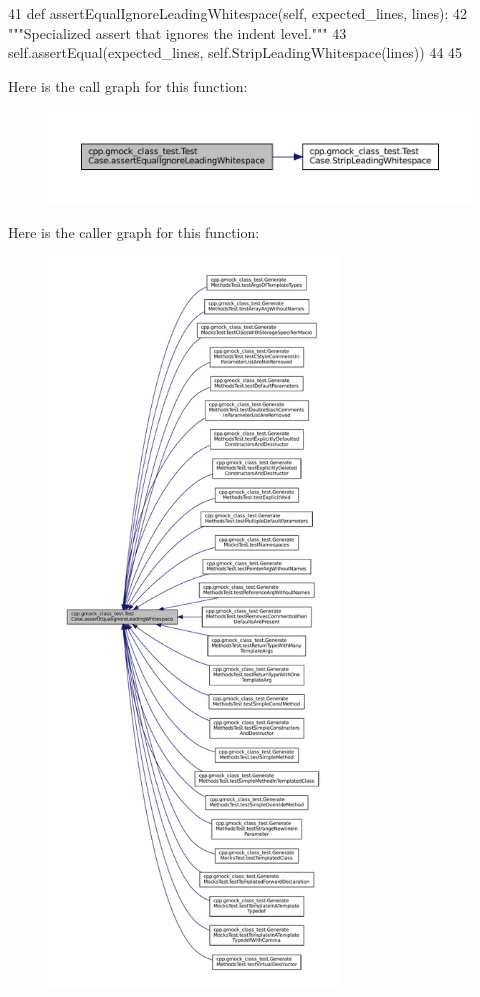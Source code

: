 \begin{DoxyCode}
41   \textcolor{keyword}{def }assertEqualIgnoreLeadingWhitespace(self, expected\_lines, lines):
42     \textcolor{stringliteral}{"""Specialized assert that ignores the indent level."""}
43     self.assertEqual(expected\_lines, self.StripLeadingWhitespace(lines))
44 
45 
\end{DoxyCode}
Here is the call graph for this function\+:
\nopagebreak
\begin{figure}[H]
\begin{center}
\leavevmode
\includegraphics[width=350pt]{classcpp_1_1gmock__class__test_1_1TestCase_a68f88bba11511f8c582123d47bf80464_cgraph}
\end{center}
\end{figure}
Here is the caller graph for this function\+:
\nopagebreak
\begin{figure}[H]
\begin{center}
\leavevmode
\includegraphics[height=550pt]{classcpp_1_1gmock__class__test_1_1TestCase_a68f88bba11511f8c582123d47bf80464_icgraph}
\end{center}
\end{figure}

